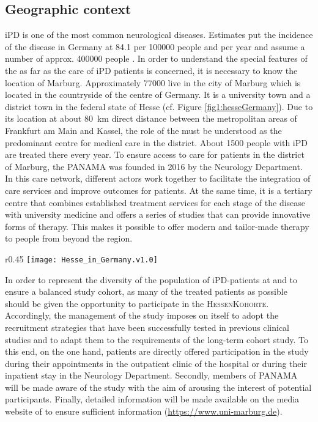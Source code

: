 \subsection{Geographic context}
\ac{iPD} is one of the most common neurological diseases. Estimates put the incidence of the disease in Germany at \SI{84.1}{} per \num[round-precision = 0, round-mode = places]{100000}{} people and per year and assume a number of approx. \num[round-precision = 0, round-mode = places]{400000}{} people \cite{nerius2017parkinson}. In order to understand the special features of the \UKGM as far as the care of \ac{iPD} patients is concerned, it is necessary to know the location of Marburg. Approximately \SI[round-precision = 0, round-mode=places]{77000}{} live in the city of Marburg which is located in the countryside of the centre of Germany. It is a university town and a district town in the federal state of Hesse (cf. Figure \ref{fig1:hesseGermany}). Due to its location at about \SI{80}{\km} direct distance between the metropolitan areas of Frankfurt am Main and Kassel, the role of the \UKGM must be understood as the predominant centre for medical care in the district. About \num[round-precision = 0, round-mode = places]{1500}{} people with \ac{iPD} are treated there every year. To ensure access to care for patients in the district of Marburg, the \ac{PANAMA} was founded in 2016 by the Neurology Department. In this care network, different actors work together to facilitate the integration of care services and improve outcomes for patients. At the same time, it is a tertiary centre that combines established treatment services for each stage of the disease with university medicine and offers a series of studies that can provide innovative forms of therapy. This makes it possible to offer modern and tailor-made therapy to people from beyond the region.

\begin{wrapfigure}{r}{0.45\textwidth} %
    \label{fig1:hesseGermany}
    \centering
    \texttt{[image: Hesse\_in\_Germany.v1.0]}
    \caption{Location of Hesse in the German Federal Republic}
\end{wrapfigure}

In order to represent the diversity of the population of \ac{iPD}-patients at \UKGM and to ensure a balanced study cohort, as many of the treated patients as possible should be given the opportunity to participate in the \textsc{HessenKohorte}. Accordingly, the management of the study imposes on itself to adopt the recruitment strategies that have been successfully tested in previous clinical studies and to adapt them to the requirements of the long-term cohort study. To this end, on the one hand, patients are directly offered participation in the study during their appointments in the outpatient clinic of the hospital or during their inpatient stay in the Neurology Department. Secondly, members of \ac{PANAMA} will be made aware of the study with the aim of arousing the interest of potential participants. Finally, detailed information will be made available on the media website of \UKGM to ensure sufficient information (\url{https://www.uni-marburg.de}).
\newpage

